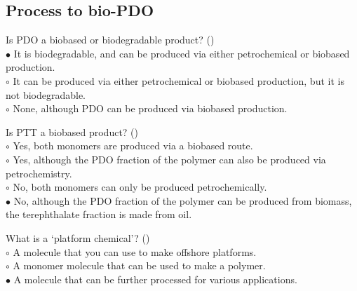 \documentclass[]{beamer}
\begin{document}
\begin{CJK}{UTF8}{gbsn}
\subsection{Process to bio-PDO}
\setcounter{answers}{0}


\begin{frame}[shrink] {} 
\addtocounter{answers}{1}
\color{blue}
  Is PDO a biobased or biodegradable product?
 ({})\\
\color{black}
\setlength{\parindent}{-0.4cm}
{\color{red}$\bullet$} It is biodegradable, and can be produced via either petrochemical or biobased production.  \\
{\color{red}$\circ$} It can be produced via either petrochemical or biobased production, but it is not biodegradable.   \\
{\color{red}$\circ$} None, although PDO can be produced via biobased production.  \\
\end{frame}


\begin{frame}[shrink] {} 
\addtocounter{answers}{1}
\color{blue}
  Is PTT a biobased product?
 ({})\\
\color{black}
\setlength{\parindent}{-0.4cm}
{\color{red}$\circ$} Yes, both monomers are produced via a biobased route.  \\
{\color{red}$\circ$} Yes, although the PDO fraction of the polymer can also be produced via petrochemistry.   \\
{\color{red}$\circ$} No, both monomers can only be produced petrochemically.   \\
{\color{red}$\bullet$} No, although the PDO fraction of the polymer can be produced from biomass, the terephthalate fraction is made from oil.   \\
\end{frame}


\begin{frame}[shrink] {} 
\addtocounter{answers}{1}
\color{blue}
  What is a ‘platform chemical’?
 ({})\\
\color{black}
\setlength{\parindent}{-0.4cm}
{\color{red}$\circ$} A molecule that you can use to make offshore platforms.  \\
{\color{red}$\circ$} A monomer molecule that can be used to make a polymer.   \\
{\color{red}$\bullet$} A molecule that can be further processed for various applications.  \\
\end{frame}



\end{CJK}
\end{document}
